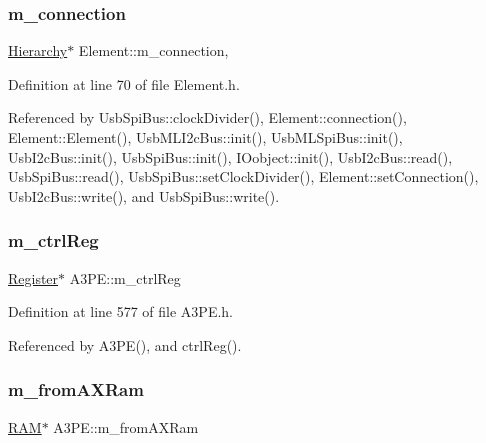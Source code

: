 \subsubsection{\texorpdfstring{m\+\_\+connection}{m\_connection}}
{\footnotesize\ttfamily \hyperlink{classHierarchy}{Hierarchy}$\ast$ Element\+::m\+\_\+connection\hspace{0.3cm}{\ttfamily [protected]}, {\ttfamily [inherited]}}



Definition at line 70 of file Element.\+h.



Referenced by Usb\+Spi\+Bus\+::clock\+Divider(), Element\+::connection(), Element\+::\+Element(), Usb\+M\+L\+I2c\+Bus\+::init(), Usb\+M\+L\+Spi\+Bus\+::init(), Usb\+I2c\+Bus\+::init(), Usb\+Spi\+Bus\+::init(), I\+Oobject\+::init(), Usb\+I2c\+Bus\+::read(), Usb\+Spi\+Bus\+::read(), Usb\+Spi\+Bus\+::set\+Clock\+Divider(), Element\+::set\+Connection(), Usb\+I2c\+Bus\+::write(), and Usb\+Spi\+Bus\+::write().

\mbox{\label{classA3PE_a264834484dd6326ebad58c2a3e1be9a6}} 
\subsubsection{\texorpdfstring{m\+\_\+ctrl\+Reg}{m\_ctrlReg}}
{\footnotesize\ttfamily \hyperlink{classRegister}{Register}$\ast$ A3\+P\+E\+::m\+\_\+ctrl\+Reg\hspace{0.3cm}{\ttfamily [private]}}



Definition at line 577 of file A3\+P\+E.\+h.



Referenced by A3\+P\+E(), and ctrl\+Reg().

\mbox{\label{classA3PE_a91d3dd3e87e2c948dd67cb82a63d3858}} 
\subsubsection{\texorpdfstring{m\+\_\+from\+A\+X\+Ram}{m\_fromAXRam}}
{\footnotesize\ttfamily \hyperlink{classRAM}{R\+AM}$\ast$ A3\+P\+E\+::m\+\_\+from\+A\+X\+Ram\hspace{0.3cm}{\ttfamily [private]}}



